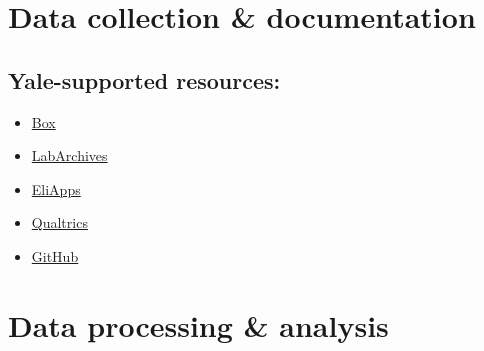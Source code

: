 \documentclass{tufte-handout}
\begin{document}
\section{Data collection \& documentation}\label{data-collection-documentation}

\subsection{Yale-supported resources:}\label{yale-supported}

\begin{itemize}
\item
  \href{http://its.yale.edu/services/collaboration-and-file-sharing/box-yale}{Box}
\item
  \href{http://its.yale.edu/services/research-technologies/elab-notebook/labarchives-faqs}{LabArchives}
\item
  \href{http://its.yale.edu/services/email-and-calendars/eliapps-google-apps-education}{EliApps}
\item
  \href{http://its.yale.edu/services/web-and-application-services/qualtrics-survey-tool}{Qualtrics}
\item
  \href{http://its.yale.edu/services/web-and-application-services/github-enterprise}{GitHub}
\end{itemize}



\section{Data processing \& analysis}\label{data-processing-analysis}
\end{document}
